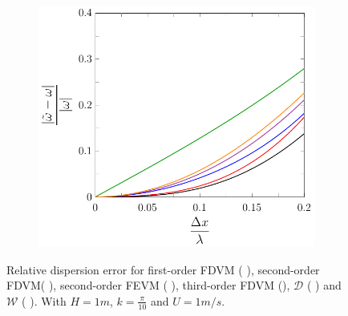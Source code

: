 \begin{figure}
\begin{subfigure}{0.5\textwidth}
	\end{subfigure}
	\par\bigskip
	\begin{subfigure}{0.5\textwidth}
		\includegraphics[width=\textwidth]{./chp4/figures/New/Dispu1Shall.pdf}
	\end{subfigure}
	\caption{Relative dispersion error for first-order FDVM ({\color{green!60!black} \solidrule}), second-order FDVM({\color{red} \solidrule}), second-order FEVM ({\color{blue} \solidrule}), third-order FDVM ({\solidrule}), $\mathcal{D}$ ({\color{violet!80!white} \solidrule}) and $\mathcal{W}$ ({\color{orange} \solidrule}). With $H = 1m$, $k = \frac{\pi}{10}$ and $U = 1 m/s$.}
	\label{fig:Dispu1Shall}
\end{figure}

